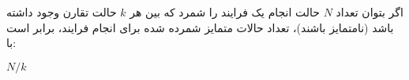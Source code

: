 
\begin{definition}
    \p
    اگر بتوان تعداد 
    $N$
    حالت انجام یک فرایند را شمرد که بین هر
    $k$
    حالت تقارن وجود داشته باشد
    (نامتمایز باشند)،
    تعداد حالات متمایز شمرده شده برای انجام فرایند، برابر است با:
    \begin{center}
    $N/k$
    \end{center}
\end{definition}

